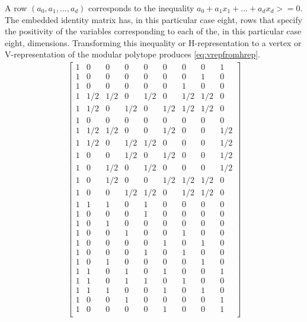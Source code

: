 A row $(a_0,a_1,...,a_d)$ corresponds to the inequality $a_0 + a_1 x_1 + ... + a_d x_d >= 0$. The embedded identity matrix has, in this particular case eight, rows that specify the positivity of the variables corresponding to each of the, in this particular case eight, dimensions. Transforming this inequality or H-representation to a vertex or V-representation of the modular polytope produces \ref{eq:vrepfromhrep}.
\begin{equation}\label{eq:vrepfromhrep}
\begin{aligned}
\begin{bmatrix}
  1 & 0 & 0 & 0 & 0 & 0 & 0 & 0 & 1\\
  1 & 0 & 0 & 0 & 0 & 0 & 0 & 1 & 0\\
  1 & 0 & 0 & 0 & 0 & 0 & 1 & 0 & 0\\
  1 & 1/2 & 1/2 & 0 & 1/2 & 0 & 1/2 & 1/2 & 0\\
  1 & 1/2 & 0 & 1/2 & 0 & 1/2 & 1/2 & 1/2 & 0\\
  1 & 0 & 0 & 0 & 0 & 0 & 0 & 0 & 0\\
  1 & 1/2 & 1/2 & 0 & 0 & 1/2 & 0 & 0 & 1/2\\
  1 & 1/2 & 0 & 1/2 & 1/2 & 0 & 0 & 0 & 1/2\\
  1 & 0 & 0 & 1/2 & 0 & 1/2 & 0 & 0 & 1/2\\
  1 & 0 & 1/2 & 0 & 1/2 & 0 & 0 & 0 & 1/2\\
  1 & 0 & 1/2 & 0 & 0 & 1/2 & 1/2 & 1/2 & 0\\
  1 & 0 & 0 & 1/2 & 1/2 & 0 & 1/2 & 1/2 & 0\\
  1 & 1 & 1 & 0 & 1 & 0 & 0 & 0 & 0\\
  1 & 0 & 0 & 0 & 1 & 0 & 0 & 0 & 0\\
  1 & 0 & 1 & 0 & 0 & 0 & 0 & 0 & 0\\
  1 & 0 & 0 & 1 & 0 & 0 & 1 & 0 & 0\\
  1 & 0 & 0 & 0 & 0 & 1 & 0 & 1 & 0\\
  1 & 0 & 0 & 0 & 1 & 0 & 1 & 0 & 0\\
  1 & 0 & 1 & 0 & 0 & 0 & 0 & 1 & 0\\
  1 & 1 & 0 & 1 & 0 & 1 & 0 & 0 & 1\\
  1 & 1 & 0 & 1 & 1 & 0 & 1 & 0 & 0\\
  1 & 1 & 1 & 0 & 0 & 1 & 0 & 1 & 0\\
  1 & 0 & 0 & 1 & 0 & 0 & 0 & 0 & 1\\
  1 & 0 & 0 & 0 & 0 & 1 & 0 & 0 & 1\\
\end{bmatrix}
\end{aligned}
\end{equation}

